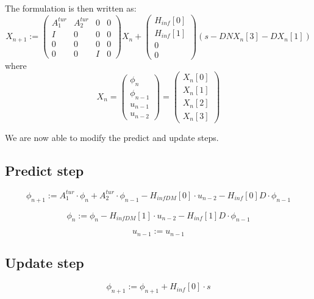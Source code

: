 \documentclass[a4,10pt]{article}
\begin{document}
The formulation is then written as:
\begin{equation}
X_{n+1}:=\begin{pmatrix}
A^{tur}_1 &A^{tur}_2&0&0\\
I&0&0&0\\
0&0&0&0\\
0&0&I&0
\end{pmatrix}X_n+\begin{pmatrix}H_{inf}[0]\\H_{inf}[1]\\0\\0\end{pmatrix}(s-DNX_n[3]-DX_n[1])
\label{eq:Kalman2}
\end{equation}
where
\begin{equation}
X_n=\begin{pmatrix}
\phi_{n}\\
\phi_{n-1}\\
u_{n-1}\\
u_{n-2}\end{pmatrix}=\begin{pmatrix}
X_n[0]\\X_n[1]\\X_n[2]\\X_n[3]
\end{pmatrix}
\end{equation}

We are now able to modify the predict and update steps.


\subsection{Predict step}
\begin{equation}
\phi_{n+1} := A^{tur}_1 \cdot \phi_{n}+ A^{tur}_2 \cdot \phi_{n-1} - H_{infDM}[0] \cdot u_{n-2} - H_{inf}[0]D\cdot\phi_{n-1}
\end{equation}

\begin{equation}
\phi_n := \phi_{n} - H_{infDM}[1] \cdot u_{n-2}- H_{inf}[1]D\cdot\phi_{n-1}
\end{equation}

\begin{equation}
u_{n-1} :=u_{n-1}
\end{equation}

\subsection{Update step}
\begin{equation}
\phi_{n+1} := \phi_{n+1} + H_{inf}[0] \cdot s
\end{equation}
\end{document}
